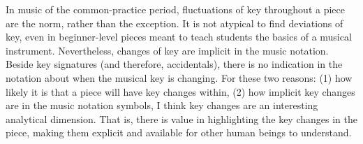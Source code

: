 

In music of the common-practice period, fluctuations of key
throughout a piece are the norm, rather than the exception.
It is not atypical to find deviations of key, even in
beginner-level pieces meant to teach students the basics of
a musical instrument. Nevertheless, changes of key are
implicit in the music notation. Beside key signatures (and
therefore, accidentals), there is no indication in the
notation about when the musical key is changing. For these
two reasons: (1) how likely it is that a piece will have key
changes within, (2) how implicit key changes are in the
music notation symbols, I think key changes are an
interesting analytical dimension. That is, there is value in
highlighting the key changes in the piece, making them
explicit and available for other human beings to understand.

